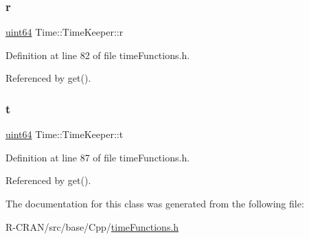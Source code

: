 \subsubsection{\texorpdfstring{r}{r}}
{\footnotesize\ttfamily \hyperlink{systemDefines_8h_abc0f5bc07737e498f287334775dff2b6}{uint64} Time\+::\+Time\+Keeper\+::r\hspace{0.3cm}{\ttfamily [private]}}



Definition at line 82 of file time\+Functions.\+h.



Referenced by get().

\mbox{\label{classTime_1_1TimeKeeper_abc07fe9dfb0c61ed901eef1bbf4a994b}} 
\subsubsection{\texorpdfstring{t}{t}}
{\footnotesize\ttfamily \hyperlink{systemDefines_8h_abc0f5bc07737e498f287334775dff2b6}{uint64} Time\+::\+Time\+Keeper\+::t\hspace{0.3cm}{\ttfamily [private]}}



Definition at line 87 of file time\+Functions.\+h.



Referenced by get().



The documentation for this class was generated from the following file\+:\begin{DoxyCompactItemize}
\item 
R-\/\+C\+R\+A\+N/src/base/\+Cpp/\hyperlink{timeFunctions_8h}{time\+Functions.\+h}\end{DoxyCompactItemize}
